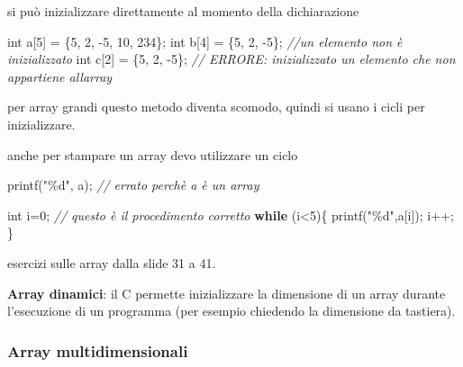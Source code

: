 \documentclass[
  paper=a4,
  oneside  ,captions=tableheading
]{scrbook}
\newenvironment{Shaded}{}{}
\newcommand{\CommentTok}[1]{\textcolor[rgb]{0.38,0.63,0.69}{\textit{#1}}}
\newcommand{\ControlFlowTok}[1]{\textcolor[rgb]{0.00,0.44,0.13}{\textbf{#1}}}
\newcommand{\DataTypeTok}[1]{\textcolor[rgb]{0.56,0.13,0.00}{#1}}
\newcommand{\DecValTok}[1]{\textcolor[rgb]{0.25,0.63,0.44}{#1}}
\newcommand{\NormalTok}[1]{#1}
\newcommand{\SpecialCharTok}[1]{\textcolor[rgb]{0.25,0.44,0.63}{#1}}
\newcommand{\StringTok}[1]{\textcolor[rgb]{0.25,0.44,0.63}{#1}}
\begin{document}
si può inizializzare direttamente al momento della dichiarazione

\begin{Shaded}
\begin{Highlighting}[]
\DataTypeTok{int}\NormalTok{ a[}\DecValTok{5}\NormalTok{] = \{}\DecValTok{5}\NormalTok{, }\DecValTok{2}\NormalTok{, {-}}\DecValTok{5}\NormalTok{, }\DecValTok{10}\NormalTok{, }\DecValTok{234}\NormalTok{\};}
\DataTypeTok{int}\NormalTok{ b[}\DecValTok{4}\NormalTok{] = \{}\DecValTok{5}\NormalTok{, }\DecValTok{2}\NormalTok{, {-}}\DecValTok{5}\NormalTok{\}; }\CommentTok{//un elemento non è inizializzato}
\DataTypeTok{int}\NormalTok{ c[}\DecValTok{2}\NormalTok{] = \{}\DecValTok{5}\NormalTok{, }\DecValTok{2}\NormalTok{, {-}}\DecValTok{5}\NormalTok{\}; }\CommentTok{// ERRORE: inizializzato un elemento che non appartiene all\textquotesingle{}array}
\end{Highlighting}
\end{Shaded}

per array grandi questo metodo diventa scomodo, quindi si usano i cicli
per inizializzare.

anche per stampare un array devo utilizzare un ciclo

\begin{Shaded}
\begin{Highlighting}[]
\NormalTok{printf(}\StringTok{"}\SpecialCharTok{\%d}\StringTok{"}\NormalTok{, a); }\CommentTok{// errato perchè a è un array}

\DataTypeTok{int}\NormalTok{ i=}\DecValTok{0}\NormalTok{; }\CommentTok{// questo è il procedimento corretto}
\ControlFlowTok{while}\NormalTok{ (i\textless{}}\DecValTok{5}\NormalTok{)\{}
\NormalTok{    printf(}\StringTok{"}\SpecialCharTok{\%d}\StringTok{"}\NormalTok{,a[i]);}
\NormalTok{    i++;}
\NormalTok{\} }
\end{Highlighting}
\end{Shaded}

esercizi sulle array dalla slide 31 a 41.

\textbf{Array dinamici}: il C permette inizializzare la dimensione di un
array durante l'esecuzione di un programma (per esempio chiedendo la
dimensione da tastiera).

\hypertarget{array-multidimensionali}{%
\subsubsection{Array multidimensionali}\label{array-multidimensionali}}
\end{document}
